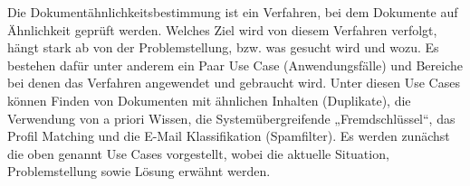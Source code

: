 


Die Dokumentähnlichkeitsbestimmung ist ein Verfahren, bei dem Dokumente auf Ähnlichkeit geprüft werden. Welches Ziel wird von diesem Verfahren verfolgt, hängt stark ab von der Problemstellung, bzw. was gesucht wird und wozu. Es bestehen dafür unter anderem ein Paar Use Case (Anwendungsfälle) und Bereiche bei denen das Verfahren angewendet und gebraucht wird. Unter diesen Use Cases können Finden von Dokumenten mit ähnlichen Inhalten (Duplikate), die Verwendung von a priori Wissen, die Systemübergreifende „Fremdschlüssel“, das Profil Matching und die E-Mail Klassifikation (Spamfilter). Es werden zunächst die oben genannt Use Cases vorgestellt, wobei die aktuelle Situation, Problemstellung sowie Lösung erwähnt werden.


